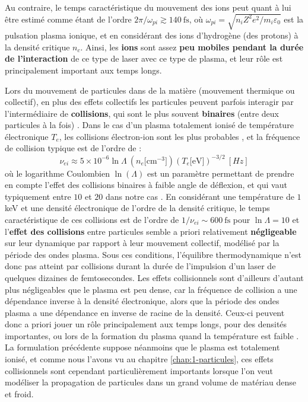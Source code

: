 \begin{refsection}
Au contraire, le temps caractéristique du mouvement des ions peut quant à lui être estimé comme étant de l'ordre $2 \pi/\omega_{pi} \gtrsim 140 ~ \si{\fs}$, où $\omega_{pi}=\sqrt{n_i Z^2 e^2/m_i \varepsilon_0}$ est la pulsation plasma ionique, et en considérant des ions d'hydrogène (des protons) à la densité critique $n_c$. Ainsi, les \textbf{ions} sont assez \textbf{peu mobiles pendant la durée de l'interaction} de ce type de laser avec ce type de plasma, et leur rôle est principalement important aux temps longs.

Lors du mouvement de particules dans de la matière (mouvement thermique ou collectif), en plus des effets collectifs les particules peuvent parfois interagir par l'intermédiaire de \textbf{collisions}, qui sont le plus souvent \textbf{binaires} (entre deux particules à la fois) \parencite{rax_2007}. Dans le cas d'un plasma totalement ionisé de température électronique $T_e$, les collisions électron-ion sont les plus probables \parencite{rax_2007}, et la fréquence de collision typique est de l'ordre de \parencite{rax_2007, nrl} :
\begin{equation}
    \nu_{ei} \approx 5 \times 10^{-6} \ln\Lambda ~ (n_e \si{[\cm^{-3}]}) \left(T_e \si{[\eV]}\right)^{-3/2} ~ \si{[Hz]}
\end{equation}
où le logarithme Coulombien $\ln(\Lambda)$ est un paramètre permettant de prendre en compte l'effet des collisions binaires à faible angle de déflexion, et qui vaut typiquement entre $10$ et $20$ dans notre cas \parencite{rax_2007}. En considérant une température de $1$ keV et une densité électronique de l'ordre de la densité critique, le temps caractéristique de ces collisions est de l'ordre de $1/\nu_{ei} \sim 600 ~ \si{\fs}$ pour $\ln\Lambda=10$ et l'\textbf{effet des collisions} entre particules semble a priori relativement \textbf{négligeable} sur leur dynamique par rapport à leur mouvement collectif, modélisé par la période des ondes plasma. Sous ces conditions, l'équilibre thermodynamique n'est donc pas atteint par collisions durant la durée de l'impulsion d'un laser de quelques dizaines de femtosecondes. Les effets collisionnels sont d'ailleurs d'autant plus négligeables que le plasma est peu dense, car la fréquence de collision a une dépendance inverse à la densité électronique, alors que la période des ondes plasma a une dépendance en inverse de racine de la densité. Ceux-ci peuvent donc a priori jouer un rôle principalement aux temps longs, pour des densités importantes, ou lors de la formation du plasma quand la température est faible \parencite{bell_1997, rax_2007, macchi_2012}. La formulation précédente suppose néanmoins que le plasma est totalement ionisé, et comme nous l'avons vu au chapitre \ref{chap:1-particules}, ces effets collisionnels sont cependant particulièrement importants lorsque l'on veut modéliser la propagation de particules dans un grand volume de matériau dense et froid. 


\end{refsection}
